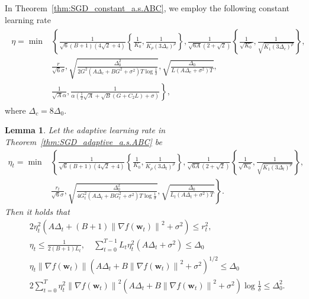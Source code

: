 \documentclass{article}
\newtheorem{lemma}{Lemma}
\newcommand{\Norm}[1]{\left\|#1\right\|}
\newcommand{\Kr}{K_{\rho}}
\newcommand{\paren}[1]{\left( #1 \right)}
\newcommand{\bw}{\mathbf{w}}
\begin{document}
In Theorem~\ref{thm:SGD_constant_a.s.ABC}, we employ the following constant learning rate
\begin{align}\label{eq:learning_rate_thm_ABC_constant}
    \begin{aligned}
    \eta=\min&\left\{
        \frac{1}{\sqrt{6}(B+1)(4\sqrt{2}+4)}\left\{\frac{1}{K_0}, \frac{1}{\Kr\paren{3\Delta_c}^\rho}\right\},
        \frac{1}{\sqrt{6A}(2+\sqrt{2})}\left\{\frac{1}{\sqrt{K_0}}, \frac{1}{\sqrt{K_1 \paren{3\Delta_c}^\rho}}\right\},\right.\\
        &\left.\frac{r}{\sqrt{6}\sigma},\sqrt{\frac{\Delta_0^2}{2G^2\paren{A\Delta_c+BG^2+\sigma^2}T\log\frac{1}{\delta}}},
        \sqrt{\frac{\Delta_0}{L\paren{A\Delta_c+\sigma^2}T}}
        \right.,\\
        &\left.
        \frac{1}{\sqrt{A}\alpha}, \frac{1}{\alpha\paren{\frac{1}{2}\sqrt{A}+\sqrt{B}\paren{G+C_2L}+\sigma}}
        \right\},
    \end{aligned}
\end{align}
where $\Delta_c=8\Delta_0$.




\begin{lemma}\label{lem:sgd_stepsize_adaptive_ABC}
    Let the adaptive learning rate in Theorem~\ref{thm:SGD_adaptive_a.s.ABC} be 
    \begin{align*}
        \eta_t=\min&\left\{
        \frac{1}{\sqrt{6}(B+1)(4\sqrt{2}+4)}\left\{\frac{1}{K_0}, \frac{1}{\Kr\paren{3\Delta_t}^\rho}\right\},
        \frac{1}{\sqrt{6A}(2+\sqrt{2})}\left\{\frac{1}{\sqrt{K_0}}, \frac{1}{\sqrt{K_1 \paren{3\Delta_t}^\rho}}\right\},\right.\\
        &\left.\frac{r_t}{\sqrt{6}\sigma},\sqrt{\frac{\Delta_0^2}{4G_t^2\paren{A\Delta_t+BG_t^2+\sigma^2}T\log\frac{1}{\delta}}},
        \sqrt{\frac{\Delta_0}{L_t\paren{A\Delta_t+\sigma^2}T}}
        \right\}.
    \end{align*}
    Then it holds that 
    \begin{align*}
        &2\eta_t^2\paren{A\Delta_t+(B+1)\Norm{\nabla f(\bw_t)}^2+\sigma^2}\leq r_t^2,\\
        &\eta_t\leq\frac{1}{2(B+1)L_t},\quad\sum_{t=0}^{T-1}L_t\eta_t^2 \paren{A\Delta_t+\sigma^2}\leq\Delta_0\\
        &\eta_t\Norm{\nabla f(\bw_t)}\paren{A\Delta_t+B\Norm{\nabla f(\bw_t)}^2+\sigma^2}^{1/2}\leq\Delta_0\\
        &2\sum_{t=0}^T\eta_t^2\Norm{\nabla f(\bw_t)}^2\paren{A\Delta_t+B\Norm{
    \nabla f(\bw_t)}^2+\sigma^2}\log\frac{1}{\delta}\leq\Delta_0^2.
    \end{align*}
\end{lemma}
\end{document}
